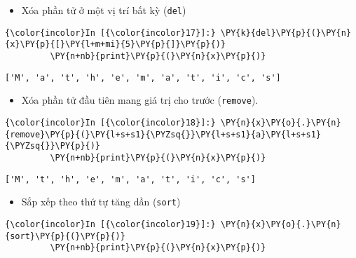     \begin{itemize}
\tightlist
\item
  Xóa phần tử ở một vị trí bất kỳ (\texttt{del})
\end{itemize}

    
\begin{Verbatim}[commandchars=\\\{\}]
{\color{incolor}In [{\color{incolor}17}]:} \PY{k}{del}\PY{p}{(}\PY{n}{x}\PY{p}{[}\PY{l+m+mi}{5}\PY{p}{]}\PY{p}{)}
         \PY{n+nb}{print}\PY{p}{(}\PY{n}{x}\PY{p}{)}
\end{Verbatim}
    

    \begin{Verbatim}[commandchars=\\\{\}]
['M', 'a', 't', 'h', 'e', 'm', 'a', 't', 'i', 'c', 's']

    \end{Verbatim}

    \begin{itemize}
\tightlist
\item
  Xóa phần tử đầu tiên mang giá trị cho trước (\texttt{remove}).
\end{itemize}

    
\begin{Verbatim}[commandchars=\\\{\}]
{\color{incolor}In [{\color{incolor}18}]:} \PY{n}{x}\PY{o}{.}\PY{n}{remove}\PY{p}{(}\PY{l+s+s1}{\PYZsq{}}\PY{l+s+s1}{a}\PY{l+s+s1}{\PYZsq{}}\PY{p}{)}
         \PY{n+nb}{print}\PY{p}{(}\PY{n}{x}\PY{p}{)}
\end{Verbatim}
    

    \begin{Verbatim}[commandchars=\\\{\}]
['M', 't', 'h', 'e', 'm', 'a', 't', 'i', 'c', 's']

    \end{Verbatim}

    \begin{itemize}
\tightlist
\item
  Sắp xếp theo thứ tự tăng dần (\texttt{sort})
\end{itemize}

    
\begin{Verbatim}[commandchars=\\\{\}]
{\color{incolor}In [{\color{incolor}19}]:} \PY{n}{x}\PY{o}{.}\PY{n}{sort}\PY{p}{(}\PY{p}{)}
         \PY{n+nb}{print}\PY{p}{(}\PY{n}{x}\PY{p}{)}
\end{Verbatim}
    

